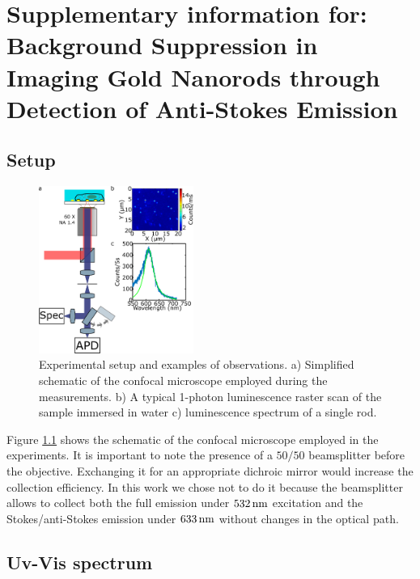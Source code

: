 \chapter[Bacgkround-Free Imaging]{Supplementary information for: Background Suppression in Imaging Gold
Nanorods through Detection of Anti-Stokes Emission}
\label{ch:SImaging}

\newpage

\section{Setup}

\begin{figure}[htp]
 \centering
 \includegraphics[width=0.45\textwidth]{Chapters/03_Background_Free/Figures/Supplementary/01_Setup/setup_1.png}
 \caption{Experimental setup and examples of observations. a) Simplified
 schematic of the confocal microscope employed during the measurements. b) A
 typical 1-photon luminescence raster scan of the sample immersed in water c)
 luminescence spectrum of a single rod.}
 \label{fig:setup}
\end{figure}

Figure \ref{fig:setup} shows the schematic of the confocal microscope employed
in the experiments. It is important to note the presence of a $50/50$
beamsplitter before the objective. Exchanging it for an appropriate dichroic
mirror would increase the collection efficiency. In this work we chose not to do
it because the beamsplitter allows to collect both the full emission under
$532\,\textrm{nm}$ excitation and the Stokes/anti-Stokes emission under $633\,\textrm{nm}$ without
changes in the optical path. 

\newpage

\section{Uv-Vis spectrum}


